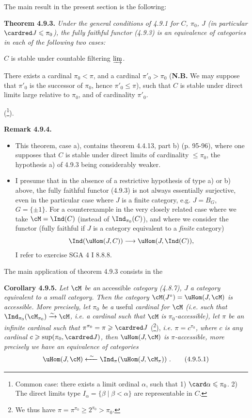 
The main result in the present section is the following:

\textbf{Theorem 4.9.3.} \textit{Under the general conditions of 4.9.1 for $C$, $\pi_0$, $J$ (in particular} $\cardred J \leqslant \pi_0$\textit{), the fully faithful functor (4.9.3) is an equivalence of categories in each of the following two cases:}
\begin{itemize}[label={}]
{\itshape
\item[a)] $C$ is stable under countable filtering $\varinjlim$.
\item[b)] There exists a cardinal $\pi_0 < \pi$, and a cardinal $\pi'_0 > \pi_0$ \textup{(}\textbf{\upshape N.B.} We may suppose that $\pi'_0$ is the successor of $\pi_0$, hence $\pi'_0 \leqslant \pi$), such that $C$ is stable under direct limits large relative to $\pi_0$, and of cardinality $\pi'_0$.
}
\end{itemize}
(\footnote[94]{Common case: there exists a limit ordinal $\alpha$, such that 1) $\card \alpha \leqslant \pi_0$. 2) The direct limits type $I_\alpha = \{\beta \mid \beta < \alpha\}$ are representable in $C$.}).

\textbf{Remark 4.9.4.}
\begin{itemize}[label={}]
\item[a)] This theorem, case a), contains theorem 4.4.13, part b) (p. 95-96), where one supposes that $C$ is stable under direct limits of cardinality $\leqslant \pi_0$, the hypothesis a) of 4.9.3 being considerably weaker.
\item[b)] I presume that in the absence of a restrictive hypothesis of type a) or b) above, the fully faithful functor (4.9.3) is not always essentially surjective, even in the particular case where $J$ is a finite category, e.g. $J = B_G$, $G = \{\pm 1\}$. For a counterexample in the very closely related case where we take $\cM = \Ind(C)$ (instead of $\Ind_{\pi_0}(C)$), and where we consider the functor (fully faithful if $J$ is a category equivalent to a \textit{finite} category) %
\[
\Ind(\uHom(J,C)) \longrightarrow \uHom(J,\Ind(C)),
\]
I refer to exercise SGA 4 I 8.8.8.
\end{itemize}
The main application of theorem 4.9.3 consists in the

\textbf{Corollary 4.9.5.} \textit{Let $\cM$ be an} accessible \textit{category (4.8.7), $J$ a category equivalent to a small category. Then the category $\cM(J^\circ) = \uHom(J,\cM)$ is accessible. More precisely, let $\pi_0$ be a} useful \textit{cardinal for $\cM$ (i.e. such that $\Ind_{\pi_0}(\cM_{\pi_0}) \xrightarrow{\sim} \cM$, i.e. a cardinal such that $\cM$ is $\pi_0$-accessible), let $\pi$ be an infinite cardinal such that $\pi^{\pi_0} = \pi \geqslant \cardred J$} (\footnote[95]{We thus have $\pi = \pi^{\pi_0} \geqslant 2^{\pi_0} > \pi_0$.}), \textit{i.e. $\pi = c^{\pi_0}$, where $c$ is any cardinal $c \geqslant \sup(\pi_0, \cardred J)$, then $\uHom(J,\cM)$ is $\pi$-accessible, more precisely we have an equivalence of categories} %
\[
\uHom(J,\cM) \xleftarrow{\ \sim\ } \Ind_\pi(\uHom(J,\cM_\pi)) \ . \tag*{(4.9.5.1)}
\]

